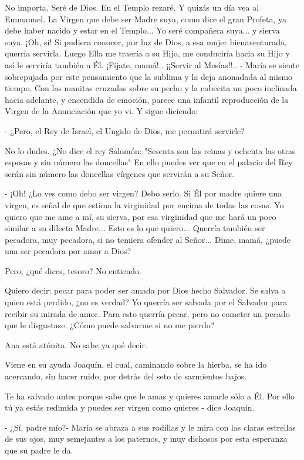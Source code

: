 \documentclass[12pt]{book} %
\begin{document}
No importa. Seré de Dios. En el Templo rezaré. Y quizás un día vea al Emmanuel. La Virgen que debe ser Madre suya, como dice el gran Profeta, ya debe haber nacido y estar en el Templo... Yo seré compañera suya... y sierva suya. ¡Oh, sí! Si pudiera conocer, por luz de Dios, a esa mujer bienaventurada, querría servirla. Luego Ella me traería a su Hijo, me conduciría hacia su Hijo y así le serviría también a Él. ¡Fíjate, mamá!.. ¡¡Servir al Mesías!!.. - María se siente sobrepujada por este pensamiento que la sublima y la deja anonadada al mismo tiempo. Con las manitas cruzadas sobre su pecho y la cabecita un poco inclinada hacia adelante, y encendida de emoción, parece una infantil reproducción de la Virgen de la Anunciación que yo vi. Y sigue diciendo: 

- ¿Pero, el Rey de Israel, el Ungido de Dios, me permitirá servirle? 

No lo dudes. ¿No dice el rey Salomón: "Sesenta son las reinas y ochenta las otras esposas y sin número las doncellas" En ello puedes ver que en el palacio del Rey serán sin número las doncellas vírgenes que servirán a su Señor. 

- ¡Oh! ¿Lo ves como debo ser virgen? Debo serlo. Si Él por madre quiere una virgen, es señal de que estima la virginidad por encima de todas las cosas. Yo quiero que me ame a mí, su sierva, por esa virginidad que me hará un poco similar a su dilecta Madre... Esto es lo que quiero... Querría también ser pecadora, muy pecadora, si no temiera ofender al Señor... Dime, mamá, ¿puede una ser pecadora por amor a Dios? 

Pero, ¿qué dices, tesoro? No entiendo. 

Quiero decir: pecar para poder ser amada por Dios hecho Salvador. Se salva a quien está perdido, ¿no es verdad? Yo querría ser salvada por el Salvador para recibir su mirada de amor. Para esto querría pecar, pero no cometer un pecado que le disgustase. ¿Cómo puede salvarme si no me pierdo? 

Ana está atónita. No sabe ya qué decir. 

Viene en su ayuda Joaquín, el cual, caminando sobre la hierba, se ha ido acercando, sin hacer ruido, por detrás del seto de sarmientos bajos. 

Te ha salvado antes porque sabe que le amas y quieres amarle sólo a Él. Por ello tú ya estás redimida y puedes ser virgen como quieres - dice Joaquín. 

- ¿Sí, padre mío?- María se abraza a sus rodillas y le mira con las claras estrellas de sus ojos, muy semejantes a los paternos, y muy dichosos por esta esperanza que su padre le da. 
\end{document}
